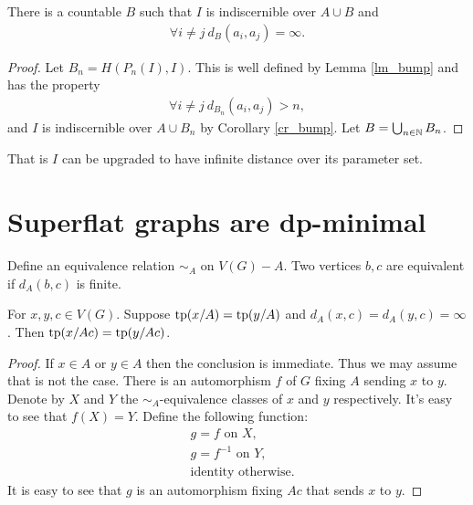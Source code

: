 \begin{Corollary} \label{inf_dis}
  There is a countable $B$ such that $I$ is indiscernible over $A \cup B$ and
  \begin{align*}
    \forall i \neq j \ d_B(a_i, a_j) = \infty.
  \end{align*}
\end{Corollary}

\begin{proof}
  Let $B_n = H(P_n(I), I)$. This is well defined by Lemma \ref{lm_bump} and has the property
  \begin{align*}
    \forall i \neq j \ d_{B_n}(a_i, a_j) > n,
  \end{align*}
  and $I$ is indiscernible over $A \cup B_n$ by Corollary \ref{cr_bump}. Let $B = \bigcup_{n \in \mathbb{N}} B_n$.
\end{proof}

That is $I$ can be upgraded to have infinite distance over its parameter set.

\section{Superflat graphs are dp-minimal}

\begin{Definition}
  Define an equivalence relation $\sim_A$ on $V(G) - A$.
  Two vertices $b,c$ are equivalent if $d_A(b,c)$ is finite.
\end{Definition}

\begin{Lemma}
  For $x,y,c \in V(G)$.
  Suppose $\operatorname{tp}(x/A) = \operatorname{tp}(y/A)$ and $d_A(x, c) = d_A(y, c) = \infty$.
  Then $\operatorname{tp}(x/Ac) = \operatorname{tp}(y/Ac)$.
\end{Lemma}

\begin{proof}
  If $x \in A$ or $y \in A$ then the conclusion is immediate.
  Thus we may assume that is not the case.
  There is an automorphism $f$ of $G$ fixing $A$ sending $x$ to $y$.
  Denote by $X$ and $Y$ the $\sim_A$-equivalence classes of $x$ and $y$ respectively.
  It's easy to see that $f(X) = Y$. Define the following function:
  \begin{align*}
    &g = f \text { on } X, \\
    &g = f^{-1} \text { on } Y, \\
    &\text{identity otherwise.}
  \end{align*}
  It is easy to see that $g$ is an automorphism fixing $Ac$ that sends $x$ to $y$.
\end{proof}

